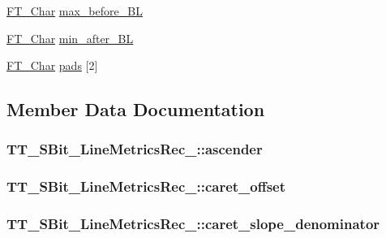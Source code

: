 \begin{DoxyCompactItemize}
\item 
\hyperlink{fttypes_8h_a0f851552b050883885f0a0855771f39d}{F\-T\-\_\-\-Char} \hyperlink{struct_t_t___s_bit___line_metrics_rec___a63599b9adfc64d1927b6a8b46d9ce08d}{max\-\_\-before\-\_\-\-B\-L}
\item 
\hyperlink{fttypes_8h_a0f851552b050883885f0a0855771f39d}{F\-T\-\_\-\-Char} \hyperlink{struct_t_t___s_bit___line_metrics_rec___a553dfe17d98fd138430545f4f77195c5}{min\-\_\-after\-\_\-\-B\-L}
\item 
\hyperlink{fttypes_8h_a0f851552b050883885f0a0855771f39d}{F\-T\-\_\-\-Char} \hyperlink{struct_t_t___s_bit___line_metrics_rec___a9f98e5de39f252b6ebfb3e94120d1dbc}{pads} \mbox{[}2\mbox{]}
\end{DoxyCompactItemize}


\subsection{Member Data Documentation}
\hypertarget{struct_t_t___s_bit___line_metrics_rec___a4114f4a3c2955d708af80a4fedac026c}{
\subsubsection[{ascender}]{ T\-T\-\_\-\-S\-Bit\-\_\-\-Line\-Metrics\-Rec\-\_\-\-::ascender}}\label{struct_t_t___s_bit___line_metrics_rec___a4114f4a3c2955d708af80a4fedac026c}
\hypertarget{struct_t_t___s_bit___line_metrics_rec___a313481bae7dbe952123b0e41d1d0bd10}{
\subsubsection[{caret\-\_\-offset}]{ T\-T\-\_\-\-S\-Bit\-\_\-\-Line\-Metrics\-Rec\-\_\-\-::caret\-\_\-offset}}\label{struct_t_t___s_bit___line_metrics_rec___a313481bae7dbe952123b0e41d1d0bd10}
\hypertarget{struct_t_t___s_bit___line_metrics_rec___a07a53a9cc279b5d98e54d1fc6fe6e480}{
\subsubsection[{caret\-\_\-slope\-\_\-denominator}]{ T\-T\-\_\-\-S\-Bit\-\_\-\-Line\-Metrics\-Rec\-\_\-\-::caret\-\_\-slope\-\_\-denominator}}\label{struct_t_t___s_bit___line_metrics_rec___a07a53a9cc279b5d98e54d1fc6fe6e480}
